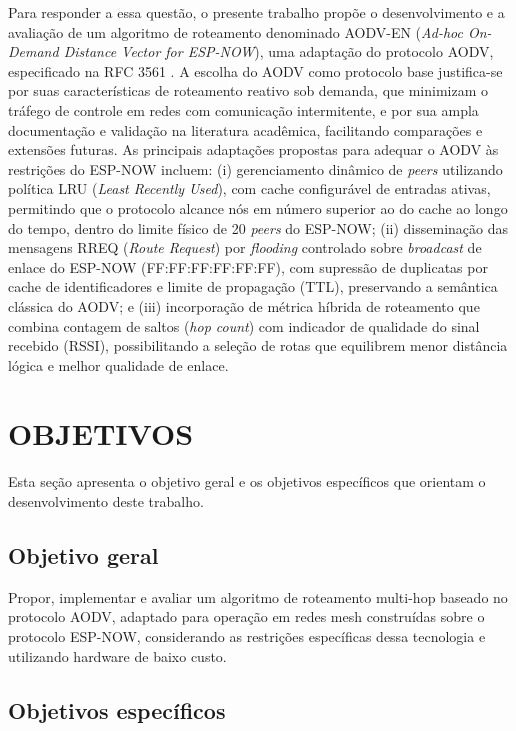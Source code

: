 Para responder a essa questão, o presente trabalho propõe o
desenvolvimento e a avaliação de um algoritmo de roteamento denominado
AODV-EN (\emph{Ad-hoc On-Demand Distance Vector for ESP-NOW}), uma
adaptação do protocolo AODV, especificado na RFC 3561 \cite{perkins2003}.
A escolha do AODV como protocolo base justifica-se por suas
características de roteamento reativo sob demanda, que minimizam o
tráfego de controle em redes com comunicação intermitente, e por sua
ampla documentação e validação na literatura acadêmica, facilitando
comparações e extensões futuras. As principais adaptações propostas para
adequar o AODV às restrições do ESP-NOW incluem: (i) gerenciamento
dinâmico de \emph{peers} utilizando política LRU (\emph{Least Recently
Used}), com cache configurável de entradas ativas, permitindo que o
protocolo alcance nós em número superior ao do cache ao longo do tempo,
dentro do limite físico de 20 \emph{peers} do ESP-NOW; (ii) disseminação
das mensagens RREQ (\emph{Route Request}) por \emph{flooding} controlado
sobre \emph{broadcast} de enlace do ESP-NOW (FF:FF:FF:FF:FF:FF), com
supressão de duplicatas por cache de identificadores e limite de
propagação (TTL), preservando a semântica clássica do AODV; e (iii)
incorporação de métrica híbrida de roteamento que combina contagem de
saltos (\emph{hop count}) com indicador de qualidade do sinal recebido
(RSSI), possibilitando a seleção de rotas que equilibrem menor distância
lógica e melhor qualidade de enlace.

\section{OBJETIVOS}\label{objetivos}

Esta seção apresenta o objetivo geral e os objetivos específicos que
orientam o desenvolvimento deste trabalho.

\subsection{Objetivo geral}\label{objetivo-geral}

Propor, implementar e avaliar um algoritmo de roteamento multi-hop
baseado no protocolo AODV, adaptado para operação em redes mesh
construídas sobre o protocolo ESP-NOW, considerando as restrições
específicas dessa tecnologia e utilizando hardware de baixo custo.

\subsection{Objetivos específicos}\label{objetivos-especuxedficos}

